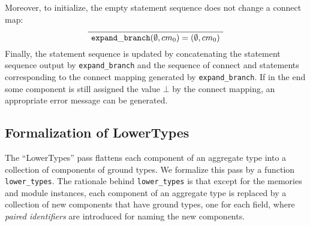 Moreover, to initialize, the empty statement sequence does not change a connect map:
{\begin{gather}
    \infer{\seqq{{\tt expand\_branch}(\emptyset, cm_0) = (\emptyset, cm_0)}}
    {} %
\end{gather}}
Finally, the statement sequence is updated by concatenating the statement sequence output by {\tt expand\_branch} and the sequence of connect and  statements corresponding to the connect mapping generated by {\tt expand\_branch}. 
If in the end some component is still assigned the value $\bot$ by the connect mapping, an appropriate error message can be generated.

\subsection{Formalization of LowerTypes}
The ``LowerTypes'' pass flattens each component of an aggregate type into a collection of components of ground types.  
We formalize this pass by a function {\tt lower\_types}. 
The rationale behind {\tt lower\_types} is that except for the memories and module instances, each component of an aggregate type is replaced by
      a collection of new components that have ground types, one for each field, where \emph{paired identifiers} are introduced for  naming the new components. 
%

